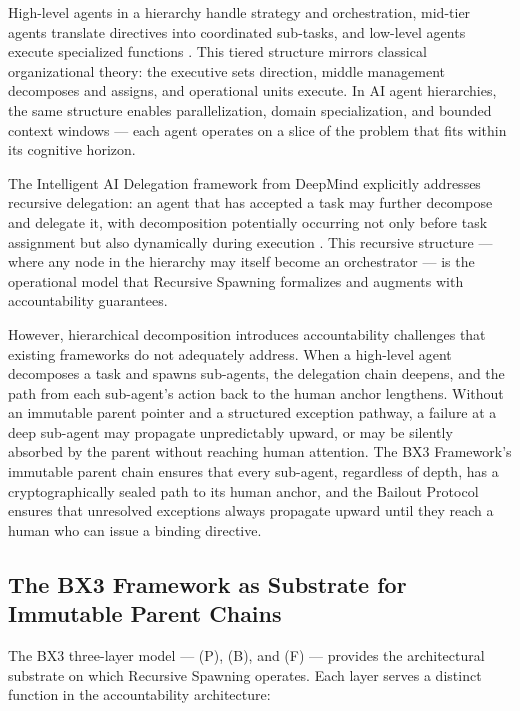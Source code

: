 High-level agents in a hierarchy handle strategy and orchestration, mid-tier agents translate directives into coordinated sub-tasks, and low-level agents execute specialized functions \cite{linkedin2025orgchart}. This tiered structure mirrors classical organizational theory: the executive sets direction, middle management decomposes and assigns, and operational units execute. In AI agent hierarchies, the same structure enables parallelization, domain specialization, and bounded context windows — each agent operates on a slice of the problem that fits within its cognitive horizon.

The Intelligent AI Delegation framework from DeepMind explicitly addresses recursive delegation: an agent that has accepted a task may further decompose and delegate it, with decomposition potentially occurring not only before task assignment but also dynamically during execution \cite{deepmind2025delegation}. This recursive structure — where any node in the hierarchy may itself become an orchestrator — is the operational model that Recursive Spawning formalizes and augments with accountability guarantees.

However, hierarchical decomposition introduces accountability challenges that existing frameworks do not adequately address. When a high-level agent decomposes a task and spawns sub-agents, the delegation chain deepens, and the path from each sub-agent's action back to the human anchor lengthens. Without an immutable parent pointer and a structured exception pathway, a failure at a deep sub-agent may propagate unpredictably upward, or may be silently absorbed by the parent without reaching human attention. The BX3 Framework's immutable parent chain ensures that every sub-agent, regardless of depth, has a cryptographically sealed path to its human anchor, and the Bailout Protocol ensures that unresolved exceptions always propagate upward until they reach a human who can issue a binding directive.

\subsection{The BX3 Framework as Substrate for Immutable Parent Chains}
\label{sec:bxthree-substrate}

The BX3 three-layer model — \purpose{} (P), \bounds{} (B), and \fact{} (F) — provides the architectural substrate on which Recursive Spawning operates. Each layer serves a distinct function in the accountability architecture:


